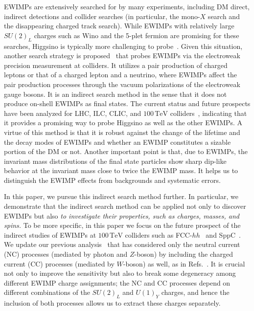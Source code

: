 \documentclass[12pt, a4paper]{article}
\begin{document}
EWIMPs are extensively searched for by many experiments, including DM
direct, indirect detections and collider searches (in particular, the
mono-$X$ search and the disappearing charged track search).  While
EWIMPs with relatively large $SU(2)_L$ charges such as Wino and the
5-plet fermion are promising for these searches, Higgsino is typically
more challenging to probe~\cite{Baer:2014cua}.
Given this situation, another search strategy is
proposed~\cite{Alves:2014cda, Gross:2016ioi,
Farina:2016rws,Harigaya:2015yaa, Matsumoto:2017vfu, Chigusa:2018vxz,
DiLuzio:2018jwd, Matsumoto:2018ioi} that probes EWIMPs via the
electroweak precision measurement at colliders.  It utilizes a pair
production of charged leptons or that of a charged lepton and a
neutrino, where EWIMPs affect the pair production processes through the
vacuum polarizations of the electroweak gauge bosons.  It is an indirect
search method in the sense that it does not produce on-shell EWIMPs as
final states. The current status and future prospects have been analyzed
for LHC, ILC, CLIC, and $100\,\mathrm{TeV}$
colliders~\cite{Mangano:2016jyj, Contino:2016spe, Golling:2016gvc},
indicating that it provides a promising way to probe Higgsino as well as
the other EWIMPs.  A virtue of this method is that it is robust against
the change of the lifetime and the decay modes of EWIMPs and whether an
EWIMP constitutes a sizable portion of the DM or not.  Another important
point is that, due to EWIMPs, the invariant mass distributions of the
final state particles show sharp dip-like behavior at the invariant mass
close to twice the EWIMP mass.  It helps us to distinguish the EWIMP
effects from backgrounds and systematic errors.

In this paper, we pursue this indirect search method further.  In
particular, we demonstrate that the indirect search method can be
applied not only to discover EWIMPs but also \textit{to investigate
  their properties, such as charges, masses, and spins.}  To be more
specific, in this paper we focus on the future prospect of the
indirect studies of EWIMPs at $100\,\mathrm{TeV}$ colliders such as
FCC-$hh$~\cite{Benedikt:2651300} and
SppC~\cite{CEPC-SPPCStudyGroup:2015csa, CEPC-SPPCStudyGroup:2015esa}.
We update our previous analysis~\cite{Chigusa:2018vxz}
that has considered only the neutral current (NC) processes (mediated
by photon and $Z$-boson) by including the charged current (CC)
processes (mediated by $W$-boson) as well, as in
Refs.~\cite{DiLuzio:2018jwd, Matsumoto:2018ioi}.  It is crucial not
only to improve the sensitivity but also to break some degeneracy
among different EWIMP charge assignments; the NC and CC processes
depend on different combinations of the $SU(2)_L$ and $U(1)_Y$
charges, and hence the inclusion of both processes allows us to
extract these charges separately.
\end{document}
